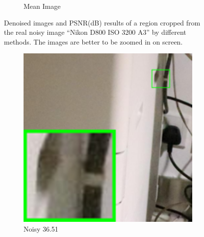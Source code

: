 \begin{figure}
\begin{subfigure}[t]{0.19\textwidth}
\caption{Mean Image}
    \end{subfigure}
    \caption{Denoised images and PSNR(dB) results of a region cropped from the real noisy image ``Nikon D800 ISO 3200 A3'' \cite{crosschannel2016} by different methods. The images are better to be zoomed in on screen.}
    \label{fig10}
\end{figure}


\begin{figure}
    \centering
    \begin{subfigure}[t]{0.19\textwidth}
        \centering
        \includegraphics[width=1\textwidth]{images/guided/resize_br_Noisy_Canon_80D_ISO12800_IMG_2321_part2.png}
		\caption{Noisy 36.51}
    \end{subfigure}
    \hfill
    \begin{subfigure}[t]{0.19\textwidth}
        \centering

\end{subfigure}
\end{figure}
